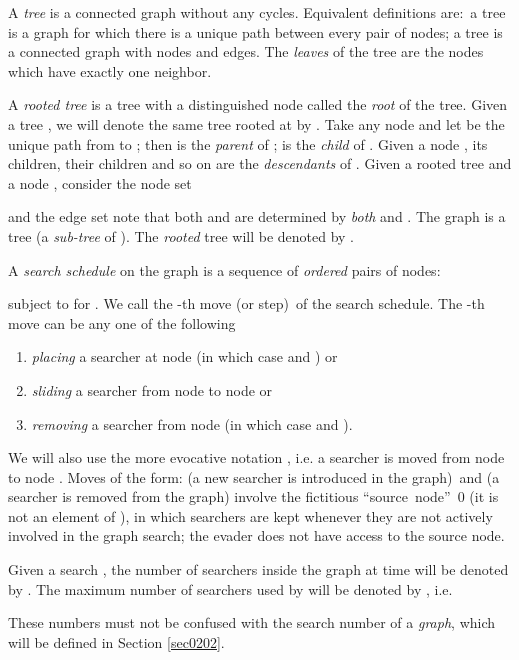 \documentclass[11pt]{article}\usepackage{amsmath}
\begin{document}
A \emph{tree} is a connected graph without any cycles. Equivalent definitions
are:\ a tree is a graph for which there is a unique path between every pair of
nodes; a tree is a connected graph with  nodes and  edges. The
\emph{leaves }of the tree are the nodes which have exactly one neighbor.

A \emph{rooted tree} is a tree with a distinguished node  called the
\emph{root }of the tree. Given a tree , we
will denote the same tree rooted at  by . Take any node  and let  be the unique path from  to ; then
 is the \emph{parent }of ;  is the \emph{child }of
. Given a node , its children, their children and so on are the
\emph{descendants} of . Given a rooted tree  and a node , consider the node set

and the edge set
note that both  and  are determined
by \emph{both}  and . The graph  is a tree (a \emph{sub-tree }of ). The
\emph{rooted }tree  will be denoted by .

A \emph{search schedule} on the graph  is a
sequence of \emph{ordered }pairs of nodes:

subject to 
for . We call  the -th move (or
step)\ of the search schedule. The -th move can be any one of the following

\begin{enumerate}
\item \emph{placing }a searcher at node  (in which case  and ) or

\item \emph{sliding} a searcher from node  to node
 or

\item \emph{removing }a searcher from node  (in which case  and ).
\end{enumerate}

We will also use the more evocative notation , i.e. a searcher is moved from node  to
node . Moves of the form:  (a new searcher is introduced in
the graph)\ and  (a searcher is removed from the graph) involve
the fictitious \textquotedblleft source\ node\textquotedblright\ 0 (it is not
an element of ), in which searchers are kept whenever they are not actively
involved in the graph search; the evader does not have access to the source node.

Given a search , the number of searchers inside the graph at time
 will be denoted by . The maximum number
of searchers used by  will be denoted by , i.e.

These numbers must not be confused with the search number of a \emph{graph},
which will be defined in Section \ref{sec0202}.
\end{document}
